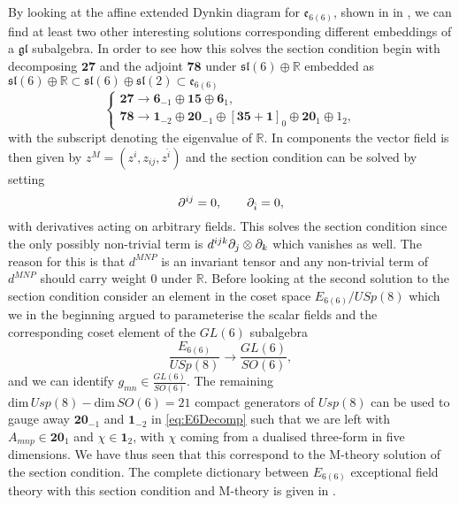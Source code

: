 By looking at the affine extended Dynkin diagram for $\mathfrak{e}_{6(6)}$, shown in in , we can find at least two other interesting solutions corresponding different embeddings of a $\mathfrak{gl}$ subalgebra. In order to see how this solves the section condition begin with decomposing $\mathbf{27}$ and the adjoint $\mathbf{78}$ under $\mathfrak{sl}(6)\oplus\mathbb{R}$ embedded as $\mathfrak{sl}(6)\oplus\mathbb{R}\subset\mathfrak{sl}(6)\oplus\mathfrak{sl}(2)\subset\mathfrak{e}_{6(6)}$ 
\begin{equation}
    \begin{cases}\label{eq:E6Decomp}
        \mathbf{27}\to \mathbf{6}_{-1}\oplus\mathbf{15}\oplus \mathbf{6}_{1},\\
        \mathbf{78}\to \mathbf{1}_{-2}\oplus\mathbf{20}_{-1}\oplus\left[\mathbf{35}+\mathbf{1}\right]_{0}\oplus\mathbf{20}_{1}\oplus 1_{2},
    \end{cases}
\end{equation}
with the subscript denoting the eigenvalue of $\mathbb{R}$. In components the vector field is then given by $z^M = (z^i,z_{ij},z^{\hat{i}})$ and the section condition can be solved by setting
\begin{equation}
    \partial^{ij} = 0,\qquad \partial_{\hat{i}} = 0,
\end{equation}
with derivatives acting on arbitrary fields. This solves the section condition since the only possibly non-trivial term is $d^{ijk}\partial_j\otimes\partial_k$ which vanishes as well. The reason for this is that $d^{MNP}$ is an invariant tensor and any non-trivial term of $d^{MNP}$ should carry weight $0$ under $\mathbb{R}$. Before looking at the second solution to the section condition consider an element in the coset space $E_{6(6)}/USp(8)$ which we in the beginning argued to parameterise the scalar fields and the corresponding coset element of the $GL(6)$ subalgebra
\begin{equation}
    \frac{E_{6(6)}}{USp(8)}\to \frac{GL(6)}{SO(6)},
\end{equation}
and we can identify $g_{mn}\in\frac{GL(6)}{SO(6)}$. The remaining $\text{dim}\, Usp(8)-\text{dim}\, SO(6)=21$ compact generators of $Usp(8)$ can be used to gauge away $\mathbf{20}_{-1}$ and $\mathbf{1}_{-2}$ in \eqref{eq:E6Decomp} such that we are left with $A_{mnp}\in \mathbf{20}_1$ and $\chi\in \mathbf{1}_{2}$, with $\chi$ coming from a dualised three-form in five dimensions. We have thus seen that this correspond to the M-theory solution of the section condition. The complete dictionary between $E_{6(6)}$ exceptional field theory with this section condition and M-theory is given in \cite{E62014}. 

